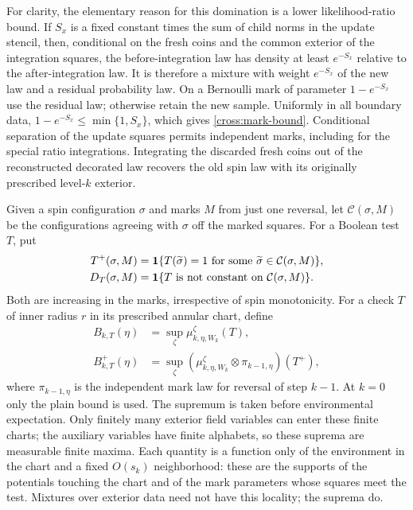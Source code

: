 For clarity, the elementary reason for this domination is a lower
likelihood-ratio bound.  If $S_x$ is a fixed constant times the sum of
child norms in the update stencil, then, conditional on the fresh coins
and the common exterior of the integration squares, the
before-integration law has density at least $e^{-S_x}$ relative to the
after-integration law.  It is therefore a
mixture with weight $e^{-S_x}$ of the new law and a residual probability
law.  On a Bernoulli mark of parameter $1-e^{-S_x}$ use the residual law;
otherwise retain the new sample.  Uniformly in all boundary data,
$1-e^{-S_x}\leq\min\{1,S_x\}$, which gives
\eqref{cross:mark-bound}.  Conditional separation of the update squares
permits independent marks, including for the special ratio integrations.
Integrating the discarded fresh coins out of the reconstructed decorated
law recovers the old spin law with its originally prescribed
level-$k$ exterior.

Given a spin configuration $\sigma$ and marks $M$ from just one reversal,
let $\mathcal C(\sigma,M)$ be the configurations agreeing with $\sigma$
off the marked squares.  For a Boolean test $T$, put
\begin{equation}
 \begin{aligned}
 T^+(\sigma,M)&=\mathbf 1\{T(\widetilde\sigma)=1
       \text{ for some }\widetilde\sigma\in\mathcal C(\sigma,M)\},\\
 D_T(\sigma,M)&=\mathbf 1\{T\text{ is not constant on }\mathcal C(\sigma,M)\}.
 \end{aligned}
 \label{cross:possibility}
\end{equation}
Both are increasing in the marks, irrespective of spin monotonicity.
For a check $T$ of inner radius $r$ in its prescribed annular chart, define
\begin{align}
 B_{k,T}(\eta)&=\sup_\zeta\mu_{k,\eta,W_k}^{\zeta}(T),\nonumber\\
 B^+_{k,T}(\eta)&=\sup_\zeta
  (\mu_{k,\eta,W_k}^{\zeta}\otimes\pi_{k-1,\eta})(T^+),
 \label{cross:envelopes}
\end{align}
where $\pi_{k-1,\eta}$ is the independent mark law for reversal of step
$k-1$.  At $k=0$ only the plain bound is used.  The supremum is taken
before environmental expectation.  Only finitely many exterior field
variables can enter these finite charts;
the auxiliary variables have finite alphabets, so these suprema are
measurable finite maxima.  Each quantity is a function only of
the environment in the chart and a fixed $O(s_k)$ neighborhood: these
are the supports of the potentials touching the chart and of the mark
parameters whose squares meet the test.  Mixtures over exterior data
need not have this locality; the suprema do.

